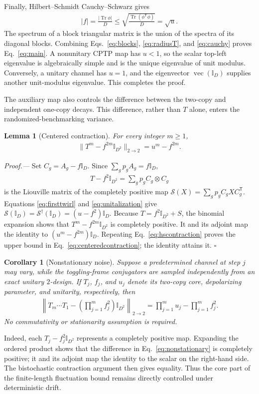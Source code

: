 \documentclass[aps,prl,reprint,superscriptaddress,nofootinbib]{revtex4-2}
\newtheorem{lemma}{Lemma}
\newtheorem{corollary}{Corollary}
\newcommand{\Tr}{\operatorname{Tr}}
\newcommand{\id}{\mathbb{I}}
\newcommand{\cS}{\mathcal{S}}
\newcommand{\vct}{\operatorname{vec}}
\begin{document}
Finally, Hilbert--Schmidt Cauchy--Schwarz gives
\begin{align}
 |f|=\frac{|\Tr\phi|}{D}
 \leq\sqrt{\frac{\Tr(\phi^{\mathsf T}\phi)}{D}}
 =\sqrt{u}.
 \label{eq:cauchy}
\end{align}
The spectrum of a block triangular matrix is the union of the spectra of its
diagonal blocks.  Combining Eqs.~\eqref{eq:blocks}, \eqref{eq:radiusT}, and
\eqref{eq:cauchy} proves Eq.~\eqref{eq:main}.  A nonunitary CPTP map has
$u<1$, so the scalar top-left eigenvalue is algebraically simple and is the
unique eigenvalue of unit modulus.  Conversely, a unitary channel has $u=1$,
and the eigenvector
$\vct(\id_D)$ supplies another unit-modulus eigenvalue.  This completes the
proof.

The auxiliary map also controls the difference between the two-copy and
independent one-copy decays.  This difference, rather than $T$ alone, enters
the randomized-benchmarking variance.

\begin{lemma}[Centered contraction]
For every integer $m\geq1$,
\begin{align}
 \bigl\lVert T^m-f^{2m}\id_{D^2}\bigr\rVert_{2\to2}
 =u^m-f^{2m}.
 \label{eq:centeredcontraction}
\end{align}
\end{lemma}
\emph{Proof.---}
Set $C_g=A_g-f\id_D$.  Since $\sum_gp_gA_g=f\id_D$,
\begin{align}
 T-f^2\id_{D^2}=\sum_gp_g C_g\otimes C_g
 \label{eq:centeredmap}
\end{align}
is the Liouville matrix of the completely positive map
$\cS(X)=\sum_gp_gC_gXC_g^{\mathsf T}$.  Equations
\eqref{eq:firsttwirl} and \eqref{eq:unitalization} give
$\cS(\id_D)=\cS^\dagger(\id_D)=(u-f^2)\id_D$.
Because $T=f^2\id_{D^2}+S$, the binomial expansion shows that
$T^m-f^{2m}\id_{D^2}$ is completely positive.  It and its adjoint map the
identity to $(u^m-f^{2m})\id_D$.  Repeating
Eq.~\eqref{eq:hscontraction} proves the upper bound in
Eq.~\eqref{eq:centeredcontraction}; the identity attains it. \hfill$\square$

\begin{corollary}[Nonstationary noise]
Suppose a predetermined channel at step $j$ may vary, while the toggling-frame
conjugators are sampled independently from an exact unitary $2$-design.  If
$T_j$, $f_j$, and $u_j$ denote its two-copy core, depolarizing parameter, and
unitarity, respectively, then
\begin{align}
 \left\lVert T_m\cdots T_1-
 \left(\prod_{j=1}^m f_j^2\right)\id_{D^2}\right\rVert_{2\to2}
 =\prod_{j=1}^m u_j-\prod_{j=1}^m f_j^2.
 \label{eq:nonstationary}
\end{align}
No commutativity or stationarity assumption is required.
\end{corollary}
Indeed, each $T_j-f_j^2\id_{D^2}$ represents a completely positive map.
Expanding the ordered product shows that the difference in
Eq.~\eqref{eq:nonstationary} is completely positive; it and its adjoint map
the identity to the scalar on the right-hand side.  The bistochastic
contraction argument then gives equality.  Thus the core part of the
finite-length fluctuation bound remains directly controlled under
deterministic drift.
\end{document}
